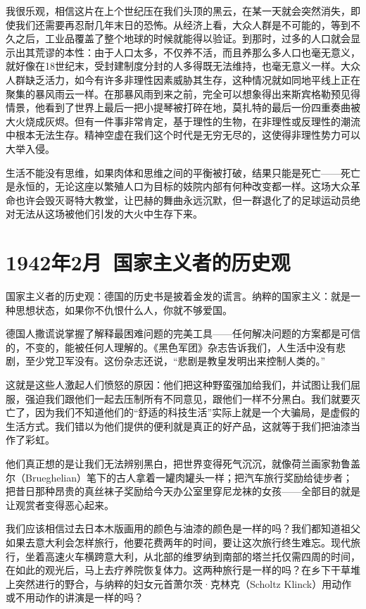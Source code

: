 \documentclass[UTF8]{ctexart}
\begin{document}
我很乐观，相信这片在上个世纪压在我们头顶的黑云，在某一天就会突然消失，即使我们还需要再忍耐几年末日的恐怖。从经济上看，大众人群是不可能的，等到不久之后，工业品覆盖了整个地球的时候就能得以验证。到那时，过多的人口就会显示出其荒谬的本性：由于人口太多，不仅养不活，而且养那么多人口也毫无意义，就好像在18世纪末，受封建制度分封的人多得既无法维持，也毫无意义一样。大众人群缺乏活力，如今有许多非理性因素威胁其生存，这种情况就如同地平线上正在聚集的暴风雨云一样。在那暴风雨到来之前，完全可以想象得出来斯宾格勒预见得情景，他看到了世界上最后一把小提琴被打碎在地，莫扎特的最后一份四重奏曲被大火烧成灰烬。但有一件事非常肯定，基于理性的生物，在非理性或反理性的潮流中根本无法生存。精神空虚在我们这个时代是无穷无尽的，这使得非理性势力可以大举入侵。

生活不能没有思维，如果肉体和思维之间的平衡被打破，结果只能是死亡——死亡是永恒的，无论这座以繁殖人口为目标的妓院内部有何种改变都一样。这场大众革命也许会毁灭哥特大教堂，让巴赫的舞曲永远沉默，但一群退化了的足球运动员绝对无法从这场被他们引发的大火中生存下来。

\section{1942年2月\ 国家主义者的历史观}

国家主义者的历史观：德国的历史书是披着金发的谎言。纳粹的国家主义：就是一种思想状态，如果你不仇恨什么人，你就不够爱国。

德国人撒谎说掌握了解释最困难问题的完美工具——任何解决问题的方案都是可信的，不变的，能被任何人理解的。《黑色军团》杂志告诉我们，人生活中没有悲剧，至少党卫军没有。这份杂志还说，“悲剧是教皇发明出来控制人类的。”

这就是这些人激起人们愤怒的原因：他们把这种野蛮强加给我们，并试图让我们屈服，强迫我们跟他们一起去压制所有不同意见，跟他们一样不分黑白。我们就要灭亡了，因为我们不知道他们的“舒适的科技生活”实际上就是一个大骗局，是虚假的生活方式。我们错以为他们提供的便利就是真正的好产品，这就等于我们把油漆当作了彩虹。

他们真正想的是让我们无法辨别黑白，把世界变得死气沉沉，就像荷兰画家勃鲁盖尔（Brueghelian）笔下的古人拿着一罐肉罐头一样；把汽车旅行奖励给徒步者；把昔日那种昂贵的真丝袜子奖励给今天办公室里穿尼龙袜的女孩——全部目的就是让观赏者变得恶心起来。

我们应该相信过去日本木版画用的颜色与油漆的颜色是一样的吗？我们都知道祖父如果去意大利会怎样旅行，他要花费两年的时间，要让这次旅行终生难忘。现代旅行，坐着高速火车横跨意大利，从北部的维罗纳到南部的塔兰托仅需四周的时间，在如此的观光后，马上去疗养院恢复体力。这两种旅行是一样的吗？在乡下干草堆上突然进行的野合，与纳粹的妇女元首萧尔茨·克林克（Scholtz Klinck）用动作或不用动作的讲演是一样的吗？
\end{document}
